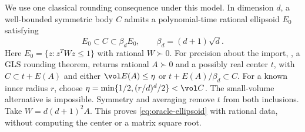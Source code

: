 We use one classical rounding consequence under this model. In dimension
$d$, a well-bounded symmetric body $C$ admits a polynomial-time rational
ellipsoid $E_0$ satisfying
\begin{equation}\label{eq:oracle-ellipsoid}
 E_0\subset C\subset\beta_dE_0,\qquad
 \beta_d=(d+1)\sqrt d.
\end{equation}
Here $E_0=\{z:z^TWz\le1\}$ with rational $W\succ0$. For precision
about the import, \citet[Theorem B.5]{dpv2011}, a GLS rounding theorem,
returns rational $A\succ0$ and a possibly real center $t$, with
$C\subset t+E(A)$ and either $\vol E(A)\le\eta$ or
$t+E(A)/\beta_d\subset C$. For a known inner radius $r$, choose
$\eta=\min\{1/2,(r/d)^d/2\}<\vol C$. The small-volume alternative is
impossible. Symmetry and averaging remove $t$ from both inclusions.
Take $W=d(d+1)^2A$. This proves \eqref{eq:oracle-ellipsoid} with rational
data, without computing the center or a matrix square root.

